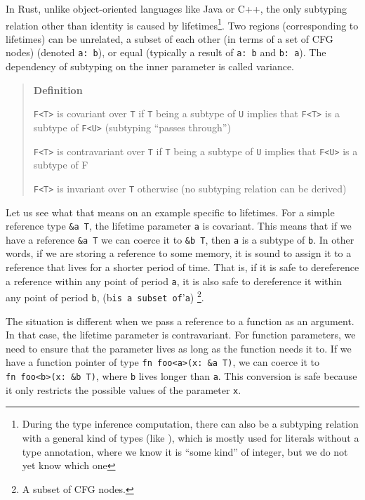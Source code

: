 \documentclass[
  11pt,
  twoside,symmetric]{report}
\begin{document}
In Rust, unlike object-oriented languages like Java or C++, the only
subtyping relation other than identity is caused by
lifetimes\footnote{During the type inference computation, there can also
  be a subtyping relation with a general kind of types (like ), which is
  mostly used for literals without a type annotation, where we know it
  is ``some kind'' of integer, but we do not yet know which one}. Two
regions (corresponding to lifetimes) can be unrelated, a subset of each
other (in terms of a set of CFG nodes) (denoted
\texttt{\textquotesingle{}a:\ \textquotesingle{}b}), or equal (typically
a result of \texttt{\textquotesingle{}a:\ \textquotesingle{}b} and
\texttt{\textquotesingle{}b:\ \textquotesingle{}a}). The dependency of
subtyping on the inner parameter is called variance.

\begin{quote}
\textbf{Definition} 

\texttt{F\textless{}T\textgreater{}} is covariant over \texttt{T} if
\texttt{T} being a subtype of \texttt{U} implies that
\texttt{F\textless{}T\textgreater{}} is a subtype of
\texttt{F\textless{}U\textgreater{}} (subtyping ``passes through'')

\texttt{F\textless{}T\textgreater{}} is contravariant over \texttt{T} if
\texttt{T} being a subtype of \texttt{U} implies that
\texttt{F\textless{}U\textgreater{}} is a subtype of F

\texttt{F\textless{}T\textgreater{}} is invariant over \texttt{T}
otherwise (no subtyping relation can be derived)
\end{quote}

Let us see what that means on an example specific to lifetimes. For a
simple reference type \texttt{\&\textquotesingle{}a\ T}, the lifetime
parameter \texttt{\textquotesingle{}a} is covariant. This means that if
we have a reference \texttt{\&\textquotesingle{}a\ T} we can coerce it
to \texttt{\&\textquotesingle{}b\ T}, then \texttt{\textquotesingle{}a}
is a subtype of \texttt{\textquotesingle{}b}. In other words, if we are
storing a reference to some memory, it is sound to assign it to a
reference that lives for a shorter period of time. That is, if it is
safe to dereference a reference within any point of period
\texttt{\textquotesingle{}a}, it is also safe to dereference it within
any point of period \texttt{\textquotesingle{}b},
(\texttt{\textquotesingle{}}b\texttt{is\ a\ subset\ of}'\texttt{a})
\footnote{A subset of CFG nodes.}.

The situation is different when we pass a reference to a function as an
argument. In that case, the lifetime parameter is contravariant. For
function parameters, we need to ensure that the parameter lives as long
as the function needs it to. If we have a function pointer of type
\texttt{fn\ foo\textless{}\textquotesingle{}a\textgreater{}(x:\ \&\textquotesingle{}a\ T)},
we can coerce it to
\texttt{fn\ foo\textless{}\textquotesingle{}b\textgreater{}(x:\ \&\textquotesingle{}b\ T)},
where \texttt{\textquotesingle{}b} lives longer than
\texttt{\textquotesingle{}a}. This conversion is safe because it only
restricts the possible values of the parameter \texttt{x}.
\end{document}
